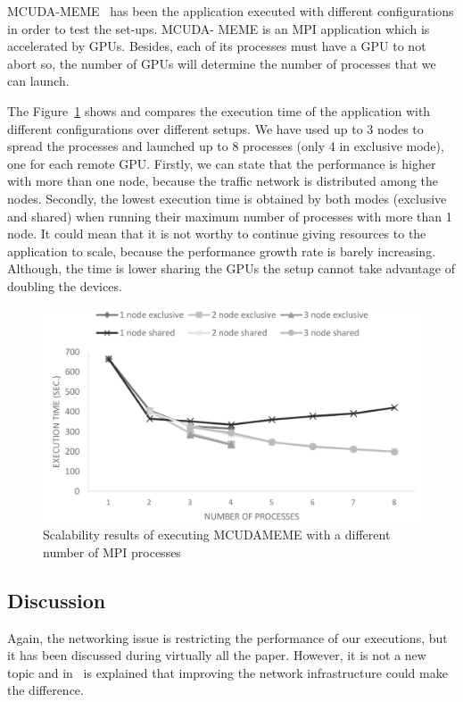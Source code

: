 \documentclass[a4paper,twoside]{article}
\begin{document}
MCUDA-MEME~\cite{Liu2010} has been the application executed with
different configurations in order to test the set-ups. MCUDA-
MEME is an MPI application which is accelerated by GPUs.
Besides, each of its processes must have a GPU to not abort 
so, the number of GPUs will determine the number of processes that we can launch.

The Figure~\ref{fig3} shows and compares the execution time of
the application with different configurations over different setups. 
We have used up to 3 nodes to spread the processes and launched up to 8 processes (only 4 in exclusive mode), one for each remote GPU.
Firstly, we can state that the performance is higher with more than one node, because the traffic network is distributed among the nodes.
Secondly, the lowest execution time is obtained by both modes (exclusive and shared) when running their maximum number of processes with more than 1 node.
It could mean that it is not worthy to continue giving resources to the application to scale, because the performance growth rate is barely increasing.
Although, the time is lower sharing the GPUs the setup cannot take advantage of doubling the devices.

\begin{figure}[htb]
  \centering
  \includegraphics[width=\linewidth]{images/mcudameme-os.pdf}
  \caption{Scalability results of executing MCUDAMEME with a different number of MPI processes}
  \label{fig3}
\end{figure}

\subsection{Discussion}
Again, the networking issue is restricting the performance of our executions, but it has been discussed during virtually all the paper.
However, it is not a new topic and in~\cite{tonithesis} is explained that improving the network infrastructure could make the difference.
\end{document}
